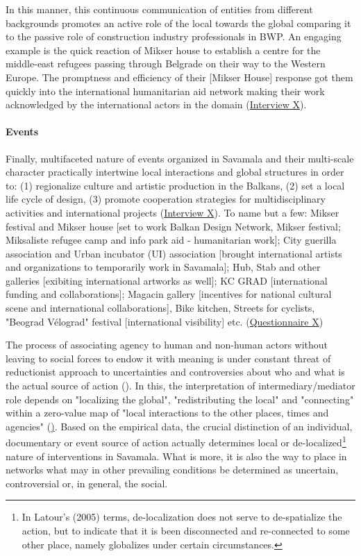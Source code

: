 \documentclass[11pt]{report}
\begin{document}
In this manner, this continuous communication of entities from different backgrounds promotes an active role of the local towards the global comparing it to the passive role of construction industry professionals in BWP.
An engaging example is the quick reaction of Mikser house to establish a centre for the middle-east refugees passing through Belgrade on their way to the Western Europe.
The promptness and efficiency of their [Mikser House] response got them quickly into the international humanitarian aid network making their work acknowledged by the international actors in the domain (\href{InterviewX}{Interview X}).


\paragraph{Events}

Finally, multifaceted nature of events organized in Savamala and their multi-scale character practically intertwine local interactions and global structures in order to:
(1) regionalize culture and artistic production in the Balkans,
(2) set a local life cycle of design,
(3) promote cooperation strategies for multidisciplinary activities and international projects (\href{InterviewX}{Interview X}).
To name but a few:
Mikser festival and Mikser house [set to work Balkan Design Network, Mikser festival; 
Miksaliste refugee camp and info park aid - humanitarian work];
City guerilla association and Urban incubator (UI) association [brought international artists and organizations to temporarily work in Savamala];
Hub, Stab and other galleries [exibiting international artworks as well];
KC GRAD [international funding and collaborations];
Magacin gallery [incentives for national cultural scene and international collaborations],
Bike kitchen, Streets for cyclists, "Beograd Vélograd" festival [international visibility]
etc.
(\href{Questionnaire Students Savamala}{Questionnaire X})


The process of associating agency to human and non-human actors without leaving to social forces to endow it with meaning is under constant threat of reductionist approach to uncertainties and controversies about who and what is the actual source of action (\href{ref}{\citealt{latour_reassembling_2005}}).
In this, the interpretation of intermediary/mediator role depends on "localizing the global", "redistributing the local" and "connecting" within a zero-value map of "local interactions to the other places, times and agencies" (\href{ibid.}).
Based on the empirical data, the crucial distinction of an individual, documentary or event source of action actually determines local or de-localized\footnote{In Latour's (2005) terms, de-localization does not serve to de-spatialize the action, but to indicate that it is been disconnected and re-connected to some other place, namely globalizes under certain circumstances.}
nature of interventions in Savamala.
What is more, it is also the way to place in networks what may in other prevailing conditions be determined as uncertain, controversial or, in general, the social.
\end{document}
